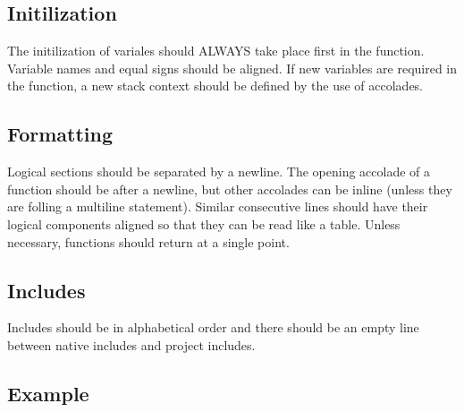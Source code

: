 \documentclass{article}
\begin{document}
\subsection{Initilization}
The initilization of variales should ALWAYS take place first in the function. Variable names and equal signs should be aligned. If new variables are required in the function, a new stack context should be defined by the use of accolades.

\subsection{Formatting}
Logical sections should be separated by a newline. The opening accolade of a function should be after a newline, but other accolades can be inline (unless they are folling a multiline statement). Similar consecutive lines should have their logical components aligned so that they can be read like a table. Unless necessary, functions should return at a single point.

\subsection{Includes}
Includes should be in alphabetical order and there should be an empty line between native includes and project includes.

\pagebreak

\subsection{Example}
\end{document}
